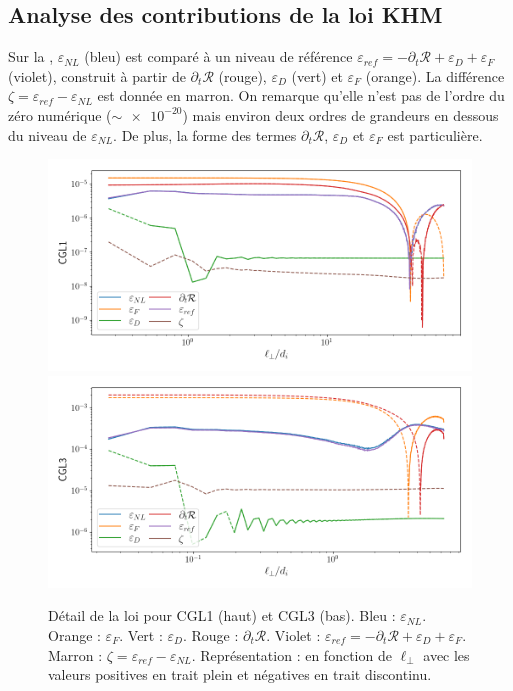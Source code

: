  
 \subsection{Analyse des contributions de la loi KHM }
 
 Sur la , $\varepsilon_{NL}$ (bleu) est comparé à un niveau de référence $\varepsilon_{ref} =- \partial_t \mathcal{R}  + \varepsilon_{D} + \varepsilon_{F}$ (violet), construit à partir de $\partial_t \mathcal{R}$ (rouge), $\varepsilon_{D}$ (vert) et $\varepsilon_{F}$ (orange). La différence $\zeta = \varepsilon_{ref} - \varepsilon_{NL}$ est donnée en marron. On remarque qu'elle n'est pas de l'ordre du zéro numérique ($\sim \num{e-20}$) mais environ deux ordres de grandeurs en dessous du niveau de $\varepsilon_{NL}$.  De plus, la forme des termes $\partial_t \mathcal{R}$, $\varepsilon_{D}$ et $\varepsilon_{F}$ est particulière.
 \begin{figure}[!ht]
  \centering
 \includegraphics[width=0.9\linewidth,trim=0cm 0cm 0cm 0cm, clip=true]{./Mainmatter/Part_3/images_ch2/CGL1_1D_lperp_alll}
 \includegraphics[width=0.9\linewidth,trim=0cm 0cm 0cm 0.5cm, clip=true]{./Mainmatter/Part_3/images_ch2/CGL3_1D_lperp_alll}
 \cprotect\caption{Détail de la loi  pour CGL1 (haut) et CGL3 (bas). Bleu : $\varepsilon_{NL}$. Orange : $\varepsilon_{F}$. Vert : $\varepsilon_{D}$. Rouge : $\partial_t \mathcal{R}$. Violet : $\varepsilon_{ref} =- \partial_t \mathcal{R}  + \varepsilon_{D} + \varepsilon_{F}$. Marron : $\zeta = \varepsilon_{ref} - \varepsilon_{NL}$. Représentation :  en fonction de $\ell_{\perp}$ avec les valeurs positives en trait plein et négatives en trait discontinu. }
 \label{fig:KHM}
 \end{figure} 
 
